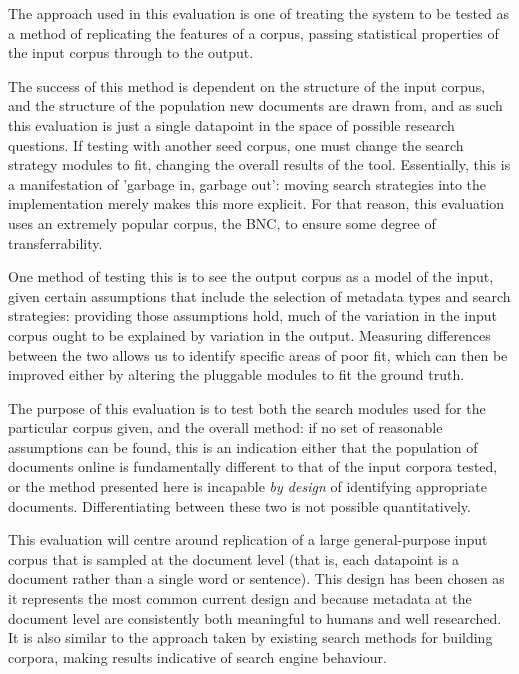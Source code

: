 

The approach used in this evaluation is one of treating the system to be tested as a method of replicating the features of a corpus, passing statistical properties of the input corpus through to the output.

The success of this method is dependent on the structure of the input corpus, and the structure of the population new documents are drawn from, and as such this evaluation is just a single datapoint in the space of possible research questions.  If testing with another seed corpus, one must change the search strategy modules to fit, changing the overall results of the tool.  Essentially, this is a manifestation of 'garbage in, garbage out': moving search strategies into the implementation merely makes this more explicit.  For that reason, this evaluation uses an extremely popular corpus, the BNC, to ensure some degree of transferrability.

One method of testing this is to see the output corpus as a model of the input, given certain assumptions that include the selection of metadata types and search strategies: providing those assumptions hold, much of the variation in the input corpus ought to be explained by variation in the output.  Measuring differences between the two allows us to identify specific areas of poor fit, which can then be improved either by altering the pluggable modules to fit the ground truth.

The purpose of this evaluation is to test both the search modules used for the particular corpus given, and the overall method: if no set of reasonable assumptions can be found, this is an indication either that the population of documents online is fundamentally different to that of the input corpora tested, or the method presented here is incapable \textsl{by design} of identifying appropriate documents.  Differentiating between these two is not possible quantitatively.


This evaluation will centre around replication of a large general-purpose input corpus that is sampled at the document level (that is, each datapoint is a document rather than a single word or sentence).  This design has been chosen as it represents the most common current design and because metadata at the document level are consistently both meaningful to humans and well researched.  It is also similar to the approach taken by existing search methods for building corpora, making results indicative of search engine behaviour.



